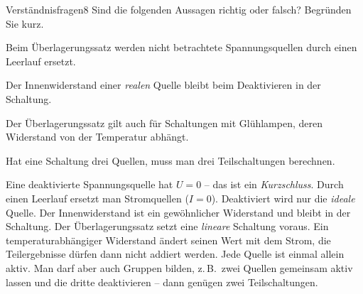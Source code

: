 \documentclass[11pt,a4paper]{article}
\begin{document}
\begin{aufgabe}{Verständnisfragen}{8}
Sind die folgenden Aussagen richtig oder falsch? Begründen Sie kurz.
\begin{teilaufgaben}
  \item Beim Überlagerungssatz werden nicht betrachtete Spannungsquellen durch einen Leerlauf ersetzt.
  \item Der Innenwiderstand einer \emph{realen} Quelle bleibt beim Deaktivieren in der Schaltung.
  \item Der Überlagerungssatz gilt auch für Schaltungen mit Glühlampen, deren Widerstand von der Temperatur abhängt.
  \item Hat eine Schaltung drei Quellen, muss man drei Teilschaltungen berechnen.
\end{teilaufgaben}
\end{aufgabe}

\begin{loesung}
Eine deaktivierte Spannungsquelle hat $U = 0$ -- das ist ein \emph{Kurzschluss}. Durch einen Leerlauf ersetzt man Stromquellen ($I = 0$).
Deaktiviert wird nur die \emph{ideale} Quelle. Der Innenwiderstand ist ein gewöhnlicher Widerstand und bleibt in der Schaltung.
Der Überlagerungssatz setzt eine \emph{lineare} Schaltung voraus. Ein temperaturabhängiger Widerstand ändert seinen Wert mit dem Strom, die Teilergebnisse dürfen dann nicht addiert werden.
Jede Quelle ist einmal allein aktiv. Man darf aber auch Gruppen bilden, z.\,B.\ zwei Quellen gemeinsam aktiv lassen und die dritte deaktivieren -- dann genügen zwei Teilschaltungen.
\end{loesung}
\end{document}
